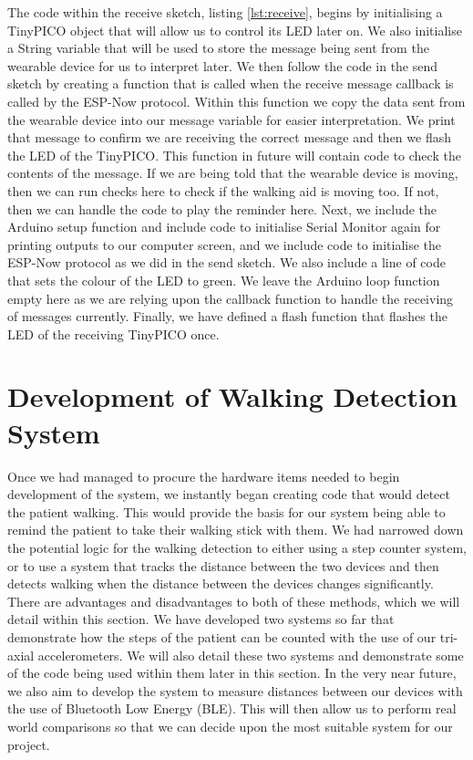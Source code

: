 {The code within the receive sketch, listing \ref{lst:receive}, begins by initialising a TinyPICO object that will allow us to control its LED later on. We also initialise a String variable that will be used to store the message being sent from the wearable device for us to interpret later. We then follow the code in the send sketch by creating a function that is called when the receive message callback is called by the ESP-Now protocol. Within this function we copy the data sent from the wearable device into our message variable for easier interpretation. We print that message to confirm we are receiving the correct message and then we flash the LED of the TinyPICO. This function in future will contain code to check the contents of the message. If we are being told that the wearable device is moving, then we can run checks here to check if the walking aid is moving too. If not, then we can handle the code to play the reminder here. Next, we include the Arduino setup function and include code to initialise Serial Monitor again for printing outputs to our computer screen, and we include code to initialise the ESP-Now protocol as we did in the send sketch. We also include a line of code that sets the colour of the LED to green. We leave the Arduino loop function empty here as we are relying upon the callback function to handle the receiving of messages currently. Finally, we have defined a flash function that flashes the LED of the receiving TinyPICO once.

\section{Development of Walking Detection System}

Once we had managed to procure the hardware items needed to begin development of the system, we instantly began creating code that would detect the patient walking. This would provide the basis for our system being able to remind the patient to take their walking stick with them. We had narrowed down the potential logic for the walking detection to either using a step counter system, or to use a system that tracks the distance between the two devices and then detects walking when the distance between the devices changes significantly. There are advantages and disadvantages to both of these methods, which we will detail within this section. We have developed two systems so far that demonstrate how the steps of the patient can be counted with the use of our tri-axial accelerometers. We will also detail these two systems and demonstrate some of the code being used within them later in this section. In the very near future, we also aim to develop the system to measure distances between our devices with the use of Bluetooth Low Energy (BLE). This will then allow us to perform real world comparisons so that we can decide upon the most suitable system for our project.

}
